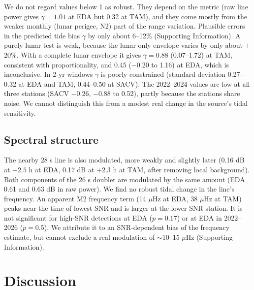 \documentclass[11pt]{article}
\begin{document}
We do not regard values below 1 as robust. They depend on the metric (raw line power gives $\gamma=1.01$ at EDA but 0.32 at TAM), and they come mostly from the weaker monthly (lunar perigee, N2) part of the range variation. Plausible errors in the predicted tide bias $\gamma$ by only about 6--12\% (Supporting Information). A purely lunar test is weak, because the lunar-only envelope varies by only about $\pm$20\%. With a complete lunar envelope it gives $\gamma=0.88$ (0.07--1.72) at TAM, consistent with proportionality, and 0.45 ($-0.20$ to 1.16) at EDA, which is inconclusive. In 2-yr windows $\gamma$ is poorly constrained (standard deviation 0.27--0.32 at EDA and TAM, 0.44--0.50 at SACV). The 2022--2024 values are low at all three stations (SACV $-0.26$, $-0.88$ to 0.52), partly because the stations share noise. We cannot distinguish this from a modest real change in the source's tidal sensitivity.

\subsection{Spectral structure}
The nearby 28 s line is also modulated, more weakly and slightly later (0.16 dB at $+2.5$ h at EDA, 0.17 dB at $+2.3$ h at TAM, after removing local background). Both components of the 26 s doublet are modulated by the same amount (EDA 0.61 and 0.63 dB in raw power). We find no robust tidal change in the line's frequency. An apparent M2 frequency term (14 $\mu$Hz at EDA, 38 $\mu$Hz at TAM) peaks near the time of lowest SNR and is larger at the lower-SNR station. It is not significant for high-SNR detections at EDA ($p=0.17$) or at EDA in 2022--2026 ($p=0.5$). We attribute it to an SNR-dependent bias of the frequency estimate, but cannot exclude a real modulation of $\sim$10--15 $\mu$Hz (Supporting Information).

\section{Discussion}
\end{document}
